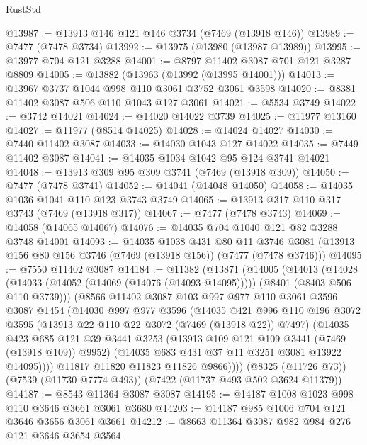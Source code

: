 \begin{lexlean}{RustStd}
\begin{coremodule}
@13987 := @13913 @146 @121 @146 @3734 (@7469 (@13918 @146))
@13989 := @7477 (@7478 @3734)
@13992 := @13975 (@13980 (@13987 @13989))
@13995 := @13977 @704 @121 @3288
@14001 := @8797 @11402 @3087 @701 @121 @3287 @8809
@14005 := @13882 (@13963 (@13992 (@13995 @14001)))
@14013 := @13967 @3737 @1044 @998 @110 @3061 @3752 @3061 @3598
@14020 := @8381 @11402 @3087 @506 @110 @1043 @127 @3061
@14021 := @5534 @3749
@14022 := @3742 @14021
@14024 := @14020 @14022 @3739
@14025 := @11977 @13160
@14027 := @11977 (@8514 @14025)
@14028 := @14024 @14027
@14030 := @7440 @11402 @3087
@14033 := @14030 @1043 @127 @14022
@14035 := @7449 @11402 @3087
@14041 := @14035 @1034 @1042 @95 @124 @3741 @14021
@14048 := @13913 @309 @95 @309 @3741 (@7469 (@13918 @309))
@14050 := @7477 (@7478 @3741)
@14052 := @14041 (@14048 @14050)
@14058 := @14035 @1036 @1041 @110 @123 @3743 @3749
@14065 := @13913 @317 @110 @317 @3743 (@7469 (@13918 @317))
@14067 := @7477 (@7478 @3743)
@14069 := @14058 (@14065 @14067)
@14076 := @14035 @704 @1040 @121 @82 @3288 @3748 @14001
@14093 := @14035
    @1038
    @431
    @80
    @11
    @3746
    @3081
    (@13913 @156 @80 @156 @3746 (@7469 (@13918 @156)) (@7477 (@7478 @3746)))
@14095 := @7550 @11402 @3087
@14184 := @11382
    (@13871
      (@14005
        (@14013
          (@14028
            (@14033 (@14052 (@14069 (@14076 (@14093 @14095)))))
            (@8401 (@8403 @506 @110 @3739)))
          (@8566
            @11402
            @3087
            @103
            @997
            @977
            @110
            @3061
            @3596
            @3087
            @1454
            (@14030
              @997
              @977
              @3596
              (@14035
                @421
                @996
                @110
                @196
                @3072
                @3595
                (@13913 @22 @110 @22 @3072 (@7469 (@13918 @22)) @7497)
                (@14035
                  @423
                  @685
                  @121
                  @39
                  @3441
                  @3253
                  (@13913 @109 @121 @109 @3441 (@7469 (@13918 @109)) @9952)
                  (@14035 @683 @431 @37 @11 @3251 @3081 @13922 @14095))))
            @11817
            @11820
            @11823
            @11826
            @9866))))
    (@8325 (@11726 @73))
    (@7539 (@11730 @7774 @493))
    (@7422 (@11737 @493 @502 @3624 @11379))
@14187 := @8543 @11364 @3087 @3087
@14195 := @14187 @1008 @1023 @998 @110 @3646 @3661 @3061 @3680
@14203 := @14187 @985 @1006 @704 @121 @3646 @3656 @3061 @3661
@14212 := @8663 @11364 @3087 @982 @984 @276 @121 @3646 @3654 @3564

\end{coremodule}
\end{lexlean}
